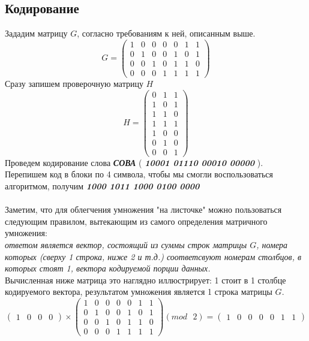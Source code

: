 \documentclass[a5paper, 10pt]{article}
\theoremstyle{definition}
\theoremstyle{plain}
\theoremstyle{remark}
\begin{document}
\subsection{Кодирование}
Зададим матрицу $G$, согласно требованиям к ней, описанным выше.
\begin{equation}
G = 
\begin{pmatrix}
1 & 0 & 0 & 0 & 0 & 1 & 1\\
0 & 1 & 0 & 0 & 1 & 0 & 1\\
0 & 0 & 1 & 0 & 1 & 1 & 0\\
0 & 0 & 0 & 1 & 1 & 1 & 1
\end{pmatrix}
\end{equation}
Сразу запишем проверочную матрицу $H$
\begin{equation}
H = 
\begin{pmatrix}
 0 & 1 & 1\\
 1 & 0 & 1\\
 1 & 1 & 0\\
 1 & 1 & 1 \\
1 & 0 & 0\\
0 & 1 & 0 \\
0 & 0 & 1
\end{pmatrix}
\end{equation}
Проведем кодирование слова \textbf{\textit{СОВА}} (  \textbf{\textit{10001 01110 00010 00000}} ). \\
Перепишем код в блоки по 4 символа, чтобы мы смогли воспользоваться алгоритмом, получим   \textbf{\textit{1000 1011 1000 0100 0000}} \\\\
Заметим, что для облегчения умножения "на листочке" можно пользоваться следующим правилом, вытекающим из самого определения матричного умножения:\\
\textit{ответом является вектор, состоящий из суммы строк матрицы $G$, номера которых (сверху 1 строка, ниже 2 и т.д.) соответсвуют номерам столбцов, в которых стоят 1, вектора кодируемой порции данных.}\\
Вычисленная ниже матрица это наглядно иллюстрирует: 1 стоит в 1 столбце кодируемого вектора, результатом умножения является 1 строка матрицы $G$.
\begin{equation}
\begin{pmatrix}
1 & 0 & 0 & 0
\end{pmatrix}
 \times
\begin{pmatrix}
1 & 0 & 0 & 0 & 0 & 1 & 1\\
0 & 1 & 0 & 0 & 1 & 0 & 1\\
0 & 0 & 1 & 0 & 1 & 1 & 0\\
0 & 0 & 0 & 1 & 1 & 1 & 1
\end{pmatrix}
(mod \text{ }2)
= \begin{pmatrix}
1 & 0 & 0 & 0 & 0 & 1 & 1
\end{pmatrix}
\end{equation}
\end{document}
